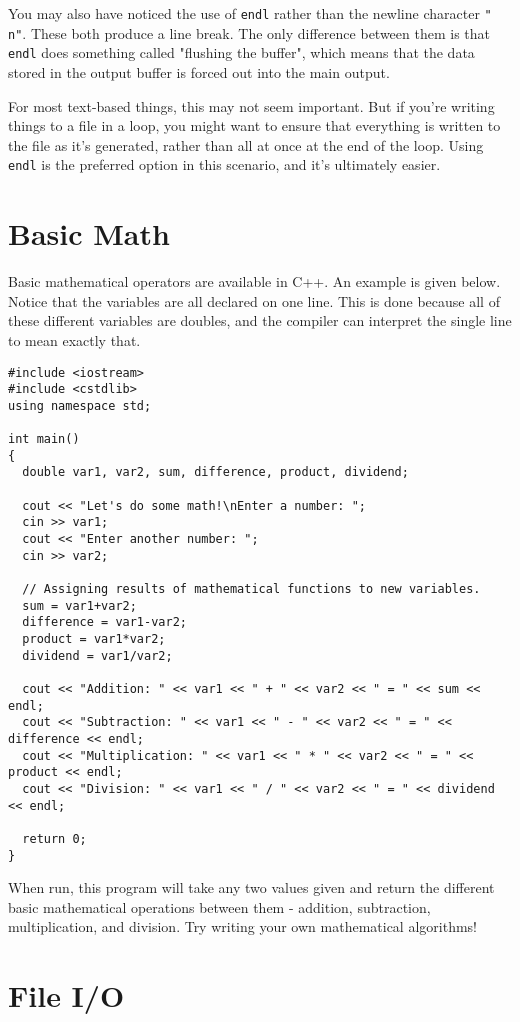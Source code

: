 You may also have noticed the use of \texttt{endl} rather than the newline character \texttt{"\\n"}.  These both produce a line break.  The only difference between them is that \texttt{endl} does something called "flushing the buffer", which means that the data stored in the output buffer is forced out into the main output.

For most text-based things, this may not seem important.  But if you're writing things to a file in a loop, you might want to ensure that everything is written to the file as it's generated, rather than all at once at the end of the loop.  Using \texttt{endl} is the preferred option in this scenario, and it's ultimately easier.
\section{Basic Math}
Basic mathematical operators are available in C++.  An example is given below.  Notice that the variables are all declared on one line.  This is done because all of these different variables are doubles, and the compiler can interpret the single line to mean exactly that.

\begin{verbatim}
#include <iostream>
#include <cstdlib>
using namespace std;

int main()
{
  double var1, var2, sum, difference, product, dividend;

  cout << "Let's do some math!\nEnter a number: ";
  cin >> var1;
  cout << "Enter another number: ";
  cin >> var2;

  // Assigning results of mathematical functions to new variables.
  sum = var1+var2;
  difference = var1-var2;
  product = var1*var2;
  dividend = var1/var2;

  cout << "Addition: " << var1 << " + " << var2 << " = " << sum << endl;
  cout << "Subtraction: " << var1 << " - " << var2 << " = " << difference << endl;
  cout << "Multiplication: " << var1 << " * " << var2 << " = " << product << endl;
  cout << "Division: " << var1 << " / " << var2 << " = " << dividend << endl;

  return 0;
}
\end{verbatim}

When run, this program will take any two values given and return the different basic mathematical operations between them - addition, subtraction, multiplication, and division.  Try writing your own mathematical algorithms!
\section{File I/O}

